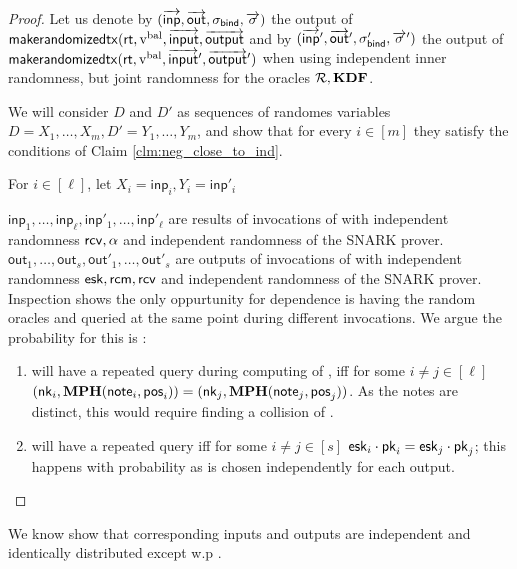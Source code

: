 \documentclass[11pt]{article}
\numberwithin{equation}{section} %
\numberwithin{figure}{section} %
\newcommand{\inp}{\ensuremath{\mathsf{inp}}\xspace}
\newcommand{\inps}{\ensuremath{\overrightarrow{\mathsf{inp}}}\xspace}
\newcommand{\outs}{\ensuremath{\overrightarrow{\mathsf{out}}}\xspace}
\newcommand{\out}{\ensuremath{\mathsf{out}}\xspace}
\begin{document}
\begin{proof}
Let us denote by $(\inps,\outs,\sigval,\sigs)$ the output of $\mathsf{makerandomizedtx}(\mathsf{rt},\mathrm{v^{bal}},\overrightarrow{\mathsf{input}},\overrightarrow{\mathsf{output}}$
and by $(\inps',\outs',\sigval',\sigs')$ the output of $\mathsf{makerandomizedtx}(\mathsf{rt},\mathrm{v^{bal}},\overrightarrow{\mathsf{input}}',\overrightarrow{\mathsf{output}}')$
when using independent inner randomness, but joint randomness for the oracles $\mathcal R,\mathbf{KDF}$.

We will consider $D$ and $D'$ as sequences of randomes variables $D=X_1,\ldots,X_m, D'= Y_1,\ldots,Y_m$,
and show that for every $i\in [m]$ they satisfy the conditions of Claim \ref{clm:neg_close_to_ind}.

For $i\in [\ell]$, let $X_i = \inp_i, Y_i = \inp'_i$





$\inp_1,\ldots,\inp_\ell,\inp'_1,\ldots,\inp'_\ell$
are results of invocations of \makeinput with independent randomness
$\mathsf{rcv},\alpha$ and independent randomness of the SNARK prover.
$\out_1,\ldots,\out_s,\out'_1,\ldots,\out'_s$ are outputs of invocations of \makerandomizedoutput with
independent randomness $\mathsf{esk},\mathsf{rcm},\mathsf{rcv}$ and independent randomness of the SNARK prover.
Inspection shows the only oppurtunity for dependence is having 
the random oracles \KDF and \RO queried at the same point during different invocations.
We argue the probability for this is \negl:
\begin{enumerate}
 \item \RO will have a repeated query during computing of \nf, iff for some $i\neq j\in [\ell]$ 
 $(\mathsf{nk}_i,\mathbf{MPH}(\mathsf{note}_i,\mathsf{pos}_i)) =(\mathsf{nk}_j,\mathbf{MPH}(\mathsf{note}_j,\mathsf{pos}_j))$.
 As the notes are distinct, this would require finding a collision of \MPH.
 \item \KDF will have a repeated query iff for some $i\neq j \in [s]$
 $\mathsf{esk}_i\cdot \mathsf{pk}_i = \mathsf{esk}_j \cdot \mathsf{pk}_j$; this happens with \negl probability as \esk is chosen independently for
 each output.
\end{enumerate}

\end{proof}

We know show that corresponding inputs and outputs are independent and identically distributed except w.p \negl.
\end{document}
